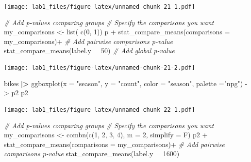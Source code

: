 \documentclass[
]{article}
\newenvironment{Shaded}{\begin{snugshade}}{\end{snugshade}}
\newcommand{\AttributeTok}[1]{\textcolor[rgb]{0.77,0.63,0.00}{#1}}
\newcommand{\CommentTok}[1]{\textcolor[rgb]{0.56,0.35,0.01}{\textit{#1}}}
\newcommand{\DecValTok}[1]{\textcolor[rgb]{0.00,0.00,0.81}{#1}}
\newcommand{\ErrorTok}[1]{\textcolor[rgb]{0.64,0.00,0.00}{\textbf{#1}}}
\newcommand{\FunctionTok}[1]{\textcolor[rgb]{0.00,0.00,0.00}{#1}}
\newcommand{\NormalTok}[1]{#1}
\newcommand{\OtherTok}[1]{\textcolor[rgb]{0.56,0.35,0.01}{#1}}
\newcommand{\SpecialCharTok}[1]{\textcolor[rgb]{0.00,0.00,0.00}{#1}}
\newcommand{\StringTok}[1]{\textcolor[rgb]{0.31,0.60,0.02}{#1}}
\begin{document}
\texttt{[image: lab1\_files/figure-latex/unnamed-chunk-21-1.pdf]}

\begin{Shaded}
\begin{Highlighting}[]
 \CommentTok{\# Add p{-}values comparing groups}
 \CommentTok{\# Specify the comparisons you want}
\NormalTok{my\_comparisons }\OtherTok{\textless{}{-}} \FunctionTok{list}\NormalTok{( }\FunctionTok{c}\NormalTok{(}\DecValTok{0}\NormalTok{, }\DecValTok{1}\NormalTok{))}
\NormalTok{p }\SpecialCharTok{+} 
  \FunctionTok{stat\_compare\_means}\NormalTok{(}\AttributeTok{comparisons =}\NormalTok{ my\_comparisons)}\SpecialCharTok{+} 
  \CommentTok{\# Add pairwise comparisons p{-}value}
  \FunctionTok{stat\_compare\_means}\NormalTok{(}\AttributeTok{label.y =} \DecValTok{50}\NormalTok{)                   }\CommentTok{\# Add global p{-}value}
\end{Highlighting}
\end{Shaded}

\texttt{[image: lab1\_files/figure-latex/unnamed-chunk-21-2.pdf]}

\begin{Shaded}
\begin{Highlighting}[]
\NormalTok{bikes }\SpecialCharTok{|}\ErrorTok{\textgreater{}} 
  \FunctionTok{ggboxplot}\NormalTok{(}\AttributeTok{x =} \StringTok{"season"}\NormalTok{, }\AttributeTok{y =} \StringTok{"count"}\NormalTok{,}
            \AttributeTok{color =} \StringTok{"season"}\NormalTok{, }\AttributeTok{palette =}\StringTok{"npg"}\NormalTok{) }\OtherTok{{-}\textgreater{}}\NormalTok{ p2}
\NormalTok{p2}
\end{Highlighting}
\end{Shaded}

\texttt{[image: lab1\_files/figure-latex/unnamed-chunk-22-1.pdf]}

\begin{Shaded}
\begin{Highlighting}[]
 \CommentTok{\# Add p{-}values comparing groups}
 \CommentTok{\# Specify the comparisons you want}
\NormalTok{my\_comparisons }\OtherTok{\textless{}{-}} \FunctionTok{combn}\NormalTok{(}\FunctionTok{c}\NormalTok{(}\DecValTok{1}\NormalTok{, }\DecValTok{2}\NormalTok{, }\DecValTok{3}\NormalTok{, }\DecValTok{4}\NormalTok{), }\AttributeTok{m =} \DecValTok{2}\NormalTok{, }\AttributeTok{simplify =}\NormalTok{ F)}
\NormalTok{p2 }\SpecialCharTok{+} 
  \FunctionTok{stat\_compare\_means}\NormalTok{(}\AttributeTok{comparisons =}\NormalTok{ my\_comparisons)}\SpecialCharTok{+} 
  \CommentTok{\# Add pairwise comparisons p{-}value}
  \FunctionTok{stat\_compare\_means}\NormalTok{(}\AttributeTok{label.y =} \DecValTok{1600}\NormalTok{)}
\end{Highlighting}
\end{Shaded}
\end{document}

